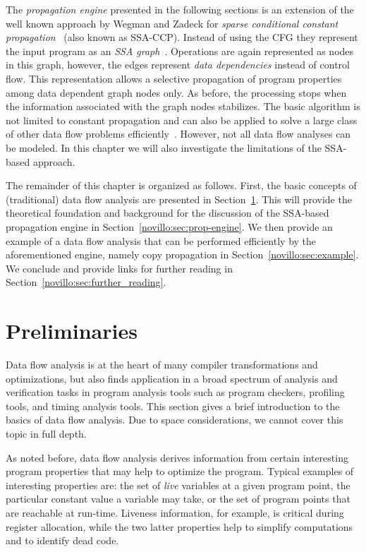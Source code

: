 The \emph{propagation engine} presented in the following sections is an
extension of the well known approach by Wegman and Zadeck for \emph{sparse
conditional constant propagation}~\cite{bib:wegman.ea-91} (also known as
SSA-CCP). Instead of using the CFG they represent the input program as an
\emph{SSA graph}~\cite{novillo:bib:cytron.ea-91}. Operations are again represented as
nodes in this graph, however, the edges represent \emph{data dependencies}
instead of control flow. This representation allows a selective propagation of
program properties among data dependent graph nodes only. As before, the
processing stops when the information associated with the graph nodes stabilizes.
The basic algorithm is not limited to constant propagation and can also be
applied to solve a large class of other data flow problems
efficiently~\cite{novillo:bib:N05}. However, not all data flow
analyses can be modeled. In this chapter we will also investigate the limitations
of the SSA-based approach.

The remainder of this chapter is organized as follows. First, the basic concepts
of (traditional) data flow analysis are presented in
Section~\ref{novillo:sec:preliminaries}. This will provide the theoretical
foundation and background for the discussion of the SSA-based propagation
engine in Section~\ref{novillo:sec:prop-engine}. We then provide an example of a
data flow analysis that can be performed efficiently by the aforementioned
engine, namely copy propagation in Section~\ref{novillo:sec:example}. We
conclude and provide links for further reading in
Section~\ref{novillo:sec:further_reading}.

\section{Preliminaries}
\label{novillo:sec:preliminaries}

Data flow analysis is at the heart of many compiler transformations and
optimizations, but also finds application in a broad spectrum of analysis and
verification tasks in program analysis tools such as program checkers, profiling
tools, and timing analysis tools. This section gives a brief introduction to the
basics of data flow analysis. Due to space considerations, we cannot cover this
topic in full depth.

As noted before, data flow analysis derives information from certain
interesting program properties that may help to optimize the program. Typical
examples of interesting properties are: the set of \emph{live} variables at a
given program point, the particular constant value a variable may take, or the
set of program points that are reachable at run-time. Liveness information, for
example, is critical during register allocation, while the two latter properties
help to simplify computations and to identify dead code.

